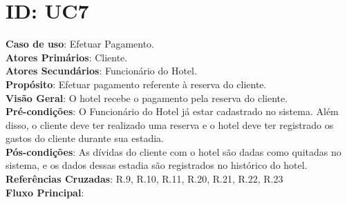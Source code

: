 \documentclass[notitlepage]{article}
\begin{document}
\clearpage

\section{ID: UC7}
\noindent\textbf{Caso de uso}: Efetuar Pagamento.\\
\textbf{Atores Primários}: Cliente. \\
\textbf{Atores Secundários}: Funcionário do Hotel.\\
\textbf{Propósito}: Efetuar pagamento referente à reserva do cliente.\\
\textbf{Visão Geral}: O hotel recebe o pagamento pela reserva do cliente.\\
\textbf{Pré-condições}: O Funcionário do Hotel já estar cadastrado no sistema. Além disso, o cliente deve ter realizado uma reserva e o hotel deve ter registrado os gastos do cliente durante sua estadia.\\
\textbf{Pós-condições}: As dívidas do cliente com o hotel são dadas como quitadas no sistema, e os dados dessas estadia são registrados no histórico do hotel.\\
\textbf{Referências Cruzadas}: R.9, R.10, R.11, R.20, R.21, R.22, R.23\\
\newline
\textbf{Fluxo Principal}:\\
\end{document}
